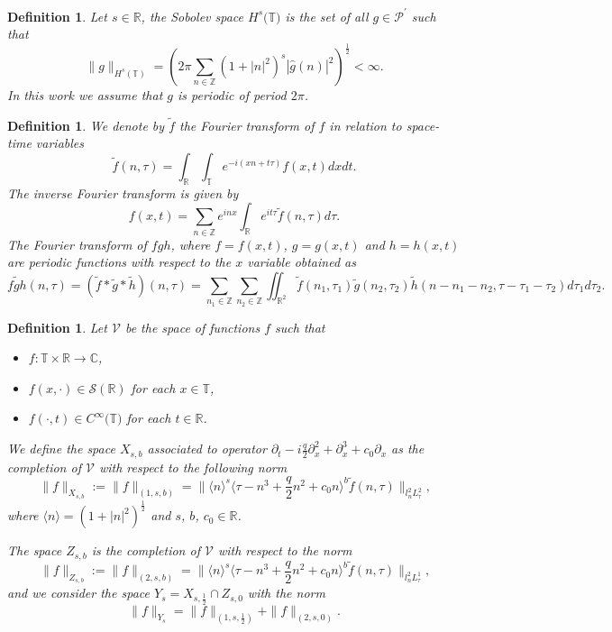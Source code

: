 \documentclass[reqno]{amsart}
\newtheorem{definition}[theorem]{Definition}
\numberwithin{equation}{section}
\begin{document}
\begin{definition}
Let $s\in\mathbb{R}$, the Sobolev space $H^{s}(\mathbb{T)}$ is the
set of all $g\in\mathcal{P}^{\prime}$ such that
\[
\| g\| _{H^{s}(\mathbb{T})}=\left(2\pi\sum\limits_{n\in
\mathbb{Z}}(1+| n| ^{2})^{s}| \widehat{g}(n)| ^{2}\right)
^{\frac{1}{2}}<\infty.
\]
In this work we assume that $g$ is periodic of period $2\pi$.
\end{definition}

\begin{definition}
We denote by $\widetilde{f}$ the Fourier transform of $f$ in
relation to space-time variables
\[
\widetilde{f}(n,\tau)= {\displaystyle\int\nolimits_{\mathbb{R}}}
\int_{\mathbb{T}}e^{-i(xn+t\tau)}f(x,t)dxdt\text{.}\]
The inverse Fourier transform is given by
\[
f(x,t)=\sum\limits_{n\in\mathbb{Z}}e^{inx}
{\displaystyle\int\nolimits_{\mathbb{R}}}
e^{it\tau}\widetilde{f}(n,\tau)d\tau\text{.}\]
The Fourier transform of $fgh$, where $f=f(x,t)$, $g=g(x,t)$ and
$h=h(x,t)$ are periodic functions with respect to  the $x$
variable obtained as
\[
\widetilde{fgh}(n,\tau)\!=\!(\widetilde{f}\ast\widetilde{g}\ast\widetilde{h})(n,\tau)
\!=\!\sum_{n_{1}\in\mathbb{Z}}\sum_{n_{2}\in\mathbb{Z}}\iint\nolimits_{\mathbb{R}
^{2}}\widetilde{f}(n_{1},\tau_{1})\widetilde{g}(n_{2},\tau_{2})\widetilde
{h}(n-n_{1}-n_{2},\tau-\tau_{1}-\tau_{2})d\tau_{1}d\tau_{2}\text{.}
\]

\end{definition}

\begin{definition}
Let $\mathcal{V}$ be the space of functions $f$ such that
\begin{itemize}
\item[(i)]  $f:\mathbb{T}\times\mathbb{R}\rightarrow\mathbb{C}$,
\item[(ii)]  $f(x,\cdot)\in\mathcal{S}(\mathbb{R})$ for each
$x\in\mathbb{T}$, \item[(iii)]  $f(\cdot,t)\in
C^{\infty}(\mathbb{T)}$ for each $t\in\mathbb{R}$.
\end{itemize}
We define the space $X_{s,b}$ associated to operator
$\partial_{t}-i\frac{q}{2}
\partial_{x}^{2}+\partial_{x}^{3}+c_{0}\partial_{x}$ as the completion of $\mathcal{V}$
with respect to the following norm\[
\| f\| _{X_{s,b}}:=\| f\| _{(1,s,b)}=\| \langle
n\rangle^{s}\langle
\tau-n^{3}+\frac{q}{2}n^{2}+c_{0}n\rangle^{b}\widetilde{f}(n,\tau)\|
_{l_{n}^{2}L_{\tau}^{2}}\text{,}
\]
where $\langle n\rangle=(1+|n|^{2})^{\frac{1}{2}}$ and $s$, $b$,
$c_{0}\in\mathbb{R}$.

The space $Z_{s,b}$ is the completion of $\mathcal{V}$ with
respect to the norm
\[
\| f\| _{Z_{s,b}}:=\| f\| _{(2,s,b)}=\| \langle
n\rangle^{s}\langle
\tau-n^{3}+\frac{q}{2}n^{2}+c_{0}n\rangle^{b}\widetilde{f}(n,\tau)\|
_{l_{n}^{2}L_{\tau}^{1}}\text{,}
\]
and we consider the space $Y_{s}=X_{s,\frac12}\cap Z_{s,0}$ with
the norm
\[
\| f\| _{Y_{s}}=\| f\| _{(1,s,\frac12
)}+\| f\| _{(2,s,0)}\text{.}
\]
\end{definition}
\end{document}
